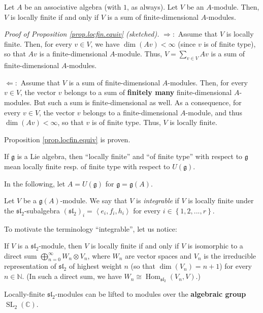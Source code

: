 \documentclass[etingof-lie.tex]{subfiles}
\begin{document}
\begin{proposition}
\label{prop.locfin.equiv}Let $A$ be an associative algebra (with $1$, as
always). Let $V$ be an $A$-module. Then, $V$ is locally finite if and only if
$V$ is a sum of finite-dimensional $A$-modules.
\end{proposition}

\textit{Proof of Proposition \ref{prop.locfin.equiv} (sketched).}
$\Longrightarrow:$ Assume that $V$ is locally finite. Then, for every $v\in
V$, we have $\dim\left(  Av\right)  <\infty$ (since $v$ is of finite type), so
that $Av$ is a finite-dimensional $A$-module. Thus, $V=\sum\limits_{v\in V}Av$
is a sum of finite-dimensional $A$-modules.

$\Longleftarrow:$ Assume that $V$ is a sum of finite-dimensional $A$-modules.
Then, for every $v\in V$, the vector $v$ belongs to a sum of \textbf{finitely
many} finite-dimensional $A$-modules. But such a sum is finite-dimensional as
well. As a consequence, for every $v\in V$, the vector $v$ belongs to a
finite-dimensional $A$-module, and thus $\dim\left(  Av\right)  <\infty$, so
that $v$ is of finite type. Thus, $V$ is locally finite.

Proposition \ref{prop.locfin.equiv} is proven.

\begin{Convention}
If $\mathfrak{g}$ is a Lie algebra, then ``locally finite'' and ``of finite
type'' with respect to $\mathfrak{g}$ mean locally finite resp. of finite type
with respect to $U\left(  \mathfrak{g}\right)  $.
\end{Convention}

In the following, let $A=U\left(  \mathfrak{g}\right)  $ for $\mathfrak{g}%
=\mathfrak{g}\left(  A\right)  $.

\begin{definition}
Let $V$ be a $\mathfrak{g}\left(  A\right)  $-module. We say that $V$ is
\textit{integrable} if $V$ is locally finite under the $\mathfrak{sl}_{2}%
$-subalgebra $\left(  \mathfrak{sl}_{2}\right)  _{i}=\left\langle e_{i}%
,f_{i},h_{i}\right\rangle $ for every $i\in\left\{  1,2,...,r\right\}  $.
\end{definition}

To motivate the terminology ``integrable'', let us notice:

\begin{proposition}
If $V$ is a $\mathfrak{sl}_{2}$-module, then $V$ is locally finite if and only
if $V$ is isomorphic to a direct sum $\bigoplus\limits_{n=0}^{\infty}%
W_{n}\otimes V_{n}$, where $W_{n}$ are vector spaces and $V_{n}$ is the
irreducible representation of $\mathfrak{sl}_{2}$ of highest weight $n$ (so
that $\dim\left(  V_{n}\right)  =n+1$) for every $n\in\mathbb{N}$. (In such a
direct sum, we have $W_{n}\cong\operatorname*{Hom}\nolimits_{\mathfrak{sl}%
_{2}}\left(  V_{n},V\right)  $.)

Locally-finite $\mathfrak{sl}_{2}$-modules can be lifted to modules over the
\textbf{algebraic group} $\operatorname*{SL}\nolimits_{2}\left(
\mathbb{C}\right)  $.
\end{proposition}
\end{document}
